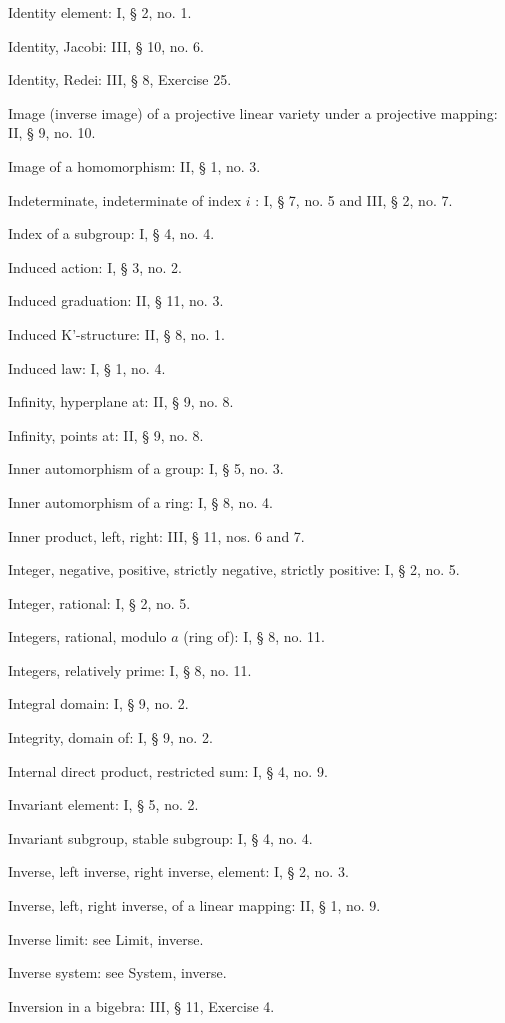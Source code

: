 Identity element: I, § 2, no. 1.

Identity, Jacobi: III, § 10, no. 6.

Identity, Redei: III, § 8, Exercise 25.

Image (inverse image) of a projective linear variety under a projective mapping: II, § 9, no. 10.

Image of a homomorphism: II, § 1, no. 3.

Indeterminate, indeterminate of index \(i\) : I, § 7, no. 5 and III, § 2, no. 7.

Index of a subgroup: I, § 4, no. 4.

Induced action: I, § 3, no. 2.

Induced graduation: II, § 11, no. 3.

Induced K'-structure: II, § 8, no. 1.

Induced law: I, § 1, no. 4.

Infinity, hyperplane at: II, § 9, no. 8.

Infinity, points at: II, § 9, no. 8.

Inner automorphism of a group: I, § 5, no. 3.

Inner automorphism of a ring: I, § 8, no. 4.

Inner product, left, right: III, § 11, nos. 6 and 7.

Integer, negative, positive, strictly negative, strictly positive: I, § 2, no. 5.

Integer, rational: I, § 2, no. 5.

Integers, rational, modulo \(a\) (ring of): I, § 8, no. 11.

Integers, relatively prime: I, § 8, no. 11.

Integral domain: I, § 9, no. 2.

Integrity, domain of: I, § 9, no. 2.

Internal direct product, restricted sum: I, § 4, no. 9.

Invariant element: I, § 5, no. 2.

Invariant subgroup, stable subgroup: I, § 4, no. 4.

Inverse, left inverse, right inverse, element: I, § 2, no. 3.

Inverse, left, right inverse, of a linear mapping: II, § 1, no. 9.

Inverse limit: see Limit, inverse.

Inverse system: see System, inverse.

Inversion in a bigebra: III, § 11, Exercise 4.

